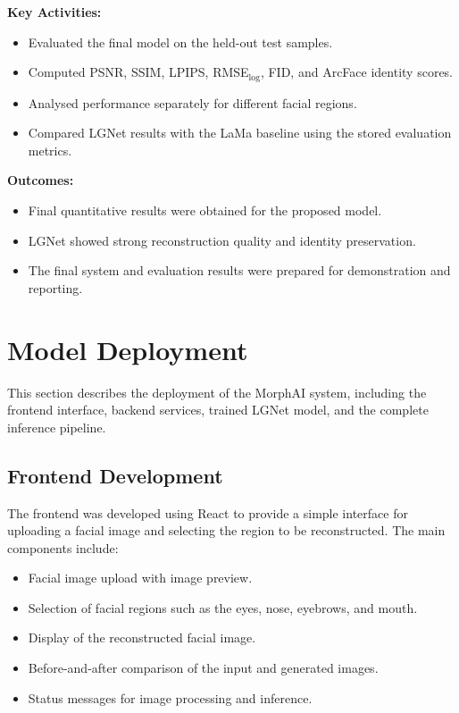 \textbf{Key Activities:}
\begin{itemize}
    \item Evaluated the final model on the held-out test samples.
    \item Computed PSNR, SSIM, LPIPS, RMSE$_{\log}$, FID, and ArcFace identity scores.
    \item Analysed performance separately for different facial regions.
    \item Compared LGNet results with the LaMa baseline using the stored evaluation metrics.
\end{itemize}

\textbf{Outcomes:}
\begin{itemize}
    \item Final quantitative results were obtained for the proposed model.
    \item LGNet showed strong reconstruction quality and identity preservation.
    \item The final system and evaluation results were prepared for demonstration and reporting.
\end{itemize}

\section{Model Deployment}

This section describes the deployment of the MorphAI system, including the
frontend interface, backend services, trained LGNet model, and the complete
inference pipeline.

\subsection{Frontend Development}

The frontend was developed using React to provide a simple interface for
uploading a facial image and selecting the region to be reconstructed. The
main components include:

\begin{itemize}
    \item Facial image upload with image preview.
    \item Selection of facial regions such as the eyes, nose, eyebrows, and mouth.
    \item Display of the reconstructed facial image.
    \item Before-and-after comparison of the input and generated images.
    \item Status messages for image processing and inference.
\end{itemize}

